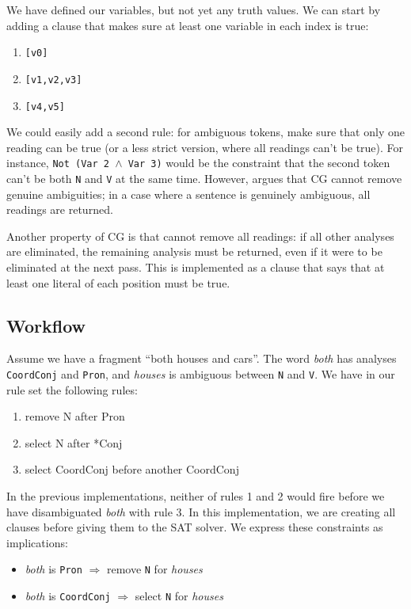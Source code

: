\documentclass[a4paper, 11pt]{article}
\begin{document}
We have defined our variables, but not yet any truth values. We can
start by adding a clause that makes sure at least one variable in each
index is true:
\begin{enumerate}
\item \texttt{[v0]}
\item \texttt{[v1,v2,v3]}
\item \texttt{[v4,v5]}
\end{enumerate}

We could easily add a second rule: for ambiguous tokens, make sure that
only one reading can be true (or a less strict version, where all
readings can't be true). For instance, \texttt{Not (Var 2 $\wedge$ Var
  3)} would be the constraint that the second token can't be both
\texttt{N} and \texttt{V} at the same time. However,
\cite{KarlssonTODO} argues that CG cannot remove genuine ambiguities;
in a case where a sentence is genuinely ambiguous, all readings are
returned.

Another property of CG is that cannot remove all readings: if all
other analyses are eliminated, the remaining analysis must be
returned, even if it were to be eliminated at the next pass. 
This is implemented as a clause that says that at least one literal
of each position must be true.

\subsection{Workflow}

Assume we have a fragment ``both houses and cars''.
The word \emph{both} has analyses \texttt{CoordConj} and
\texttt{Pron}, and \emph{houses} is ambiguous between \texttt{N} and \texttt{V}.
We have in our rule set the following rules:

\begin{enumerate}
\item remove N after Pron
\item select N after *Conj
\item select CoordConj before another CoordConj
\end{enumerate}

In the previous implementations, neither of rules 1 and 2 would fire
before we have disambiguated \emph{both} with rule 3.
In this implementation, we are creating all clauses before giving
them to the SAT solver. We express these constraints as implications:
\begin{itemize}
\item \emph{both} is \texttt{Pron} $\Rightarrow$ remove \texttt{N} for \emph{houses}
\item \emph{both} is \texttt{CoordConj} $\Rightarrow$ select
  \texttt{N} for \emph{houses}
\end{itemize}
\end{document}
